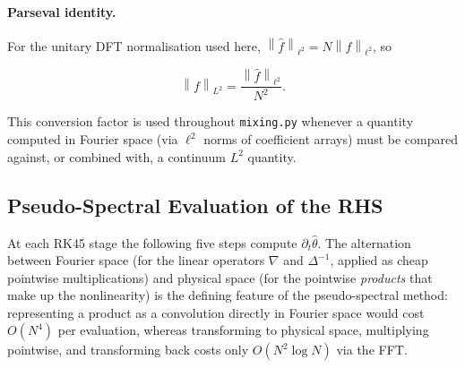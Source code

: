 \documentclass[12pt,a4paper]{article}
\newcommand{\norm}[1]{\left\lVert#1\right\rVert}
\newcommand{\lapinv}{\Delta^{-1}}
\theoremstyle{definition}
\theoremstyle{plain}
\begin{document}
\paragraph{Parseval identity.}
For the unitary DFT normalisation used here,
$\norm{\hat f}_{\ell^2} = N\norm{f}_{\ell^2}$, so

\begin{equation}
  \norm{f}_{L^2} = \frac{\norm{\hat f}_{\ell^2}}{N^2}.
\end{equation}

This conversion factor is used throughout \texttt{mixing.py} whenever a
quantity computed in Fourier space (via $\ell^2$ norms of coefficient
arrays) must be compared against, or combined with, a continuum $L^2$
quantity.

\subsection{Pseudo-Spectral Evaluation of the RHS}
\label{sec:rhs}

At each RK45 stage the following five steps compute $\partial_t\hat\theta$.
The alternation between Fourier space (for the linear operators $\nabla$
and $\lapinv$, applied as cheap pointwise multiplications) and physical
space (for the pointwise \emph{products} that make up the nonlinearity)
is the defining feature of the pseudo-spectral method: representing a
product as a convolution directly in Fourier space would cost $O(N^4)$
per evaluation, whereas transforming to physical space, multiplying
pointwise, and transforming back costs only $O(N^2\log N)$ via the FFT.
\end{document}
